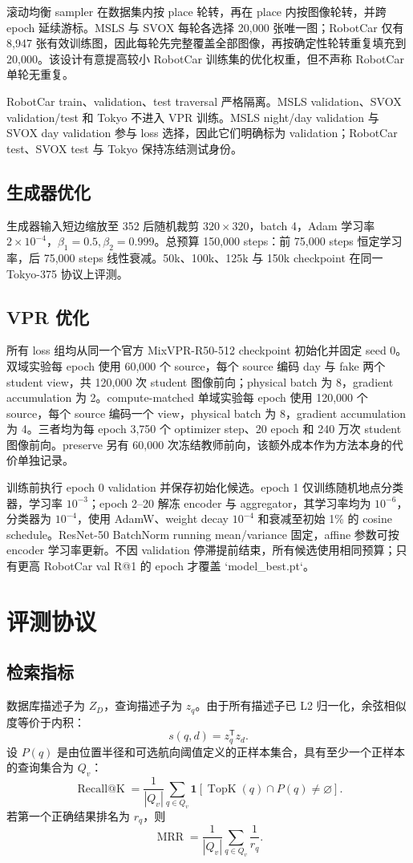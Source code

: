\documentclass[UTF8,a4paper,11pt]{ctexart}
\begin{document}
滚动均衡 sampler 在数据集内按 place 轮转，再在 place 内按图像轮转，并跨 epoch 延续游标。MSLS 与 SVOX 每轮各选择 20,000 张唯一图；RobotCar 仅有 8,947 张有效训练图，因此每轮先完整覆盖全部图像，再按确定性轮转重复填充到 20,000。该设计有意提高较小 RobotCar 训练集的优化权重，但不声称 RobotCar 单轮无重复。

RobotCar train、validation、test traversal 严格隔离。MSLS validation、SVOX validation/test 和 Tokyo 不进入 VPR 训练。MSLS night/day validation 与 SVOX day validation 参与 loss 选择，因此它们明确标为 validation；RobotCar test、SVOX test 与 Tokyo 保持冻结测试身份。

\subsection{生成器优化}
生成器输入短边缩放至 352 后随机裁剪 $320\times320$，batch 4，Adam 学习率 $2\times10^{-4}$，$\beta_1=0.5,\beta_2=0.999$。总预算 150,000 steps：前 75,000 steps 恒定学习率，后 75,000 steps 线性衰减。50k、100k、125k 与 150k checkpoint 在同一 Tokyo-375 协议上评测。

\subsection{VPR 优化}
所有 loss 组均从同一个官方 MixVPR-R50-512 checkpoint 初始化并固定 seed 0。双域实验每 epoch 使用 60,000 个 source，每个 source 编码 day 与 fake 两个 student view，共 120,000 次 student 图像前向；physical batch 为 8，gradient accumulation 为 2。compute-matched 单域实验每 epoch 使用 120,000 个 source，每个 source 编码一个 view，physical batch 为 8，gradient accumulation 为 4。三者均为每 epoch 3,750 个 optimizer step、20 epoch 和 240 万次 student 图像前向。preserve 另有 60,000 次冻结教师前向，该额外成本作为方法本身的代价单独记录。

训练前执行 epoch 0 validation 并保存初始化候选。epoch 1 仅训练随机地点分类器，学习率 $10^{-3}$；epoch 2--20 解冻 encoder 与 aggregator，其学习率均为 $10^{-6}$，分类器为 $10^{-4}$，使用 AdamW、weight decay $10^{-4}$ 和衰减至初始 1\% 的 cosine schedule。ResNet-50 BatchNorm running mean/variance 固定，affine 参数可按 encoder 学习率更新。不因 validation 停滞提前结束，所有候选使用相同预算；只有更高 RobotCar val R@1 的 epoch 才覆盖 `model\_best.pt`。

\section{评测协议}
\subsection{检索指标}
数据库描述子为 $Z_D$，查询描述子为 $z_q$。由于所有描述子已 L2 归一化，余弦相似度等价于内积：
\[
 s(q,d)=z_q^{\mathsf T}z_d.
\]
设 $P(q)$ 是由位置半径和可选航向阈值定义的正样本集合，具有至少一个正样本的查询集合为 $Q_v$：
\[
 \operatorname{Recall@K}=\frac1{|Q_v|}\sum_{q\in Q_v}
 \mathbf 1[\operatorname{TopK}(q)\cap P(q)\ne\varnothing].
\]
若第一个正确结果排名为 $r_q$，则
\[
 \operatorname{MRR}=\frac1{|Q_v|}\sum_{q\in Q_v}\frac1{r_q}.
\]
\end{document}
